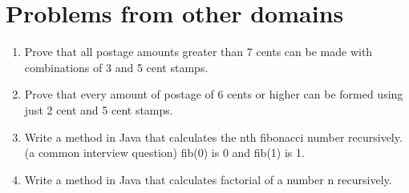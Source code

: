 \documentclass{article}
\begin{document}
\section{Problems from other domains}
\begin{enumerate}
\item Prove that all postage amounts greater than 7 cents can be made with combinations of 3 and 5 cent stamps.

\item Prove that every amount of postage of 6 cents or higher can be formed using just 2 cent and 5 cent stamps.

\item Write a method in Java that calculates the nth fibonacci number recursively. (a common interview question) fib(0) is 0 and fib(1) is 1.

\item Write a method in Java that calculates factorial of a number n recursively.
\end{enumerate}
\end{document}
